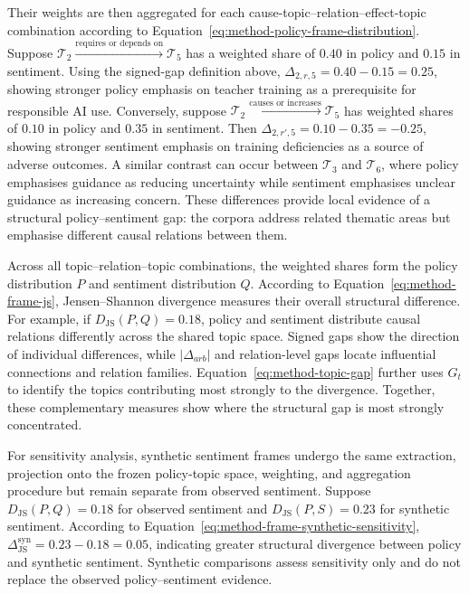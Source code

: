 {Their weights are then aggregated for each cause-topic--relation--effect-topic
combination according to Equation~\ref{eq:method-policy-frame-distribution}. Suppose
$\mathcal{T}_2\xrightarrow{\text{requires or depends on}}\mathcal{T}_5$ has a
weighted share of $0.40$ in policy and $0.15$ in sentiment. Using the signed-gap
definition above, $\Delta_{2,r,5}=0.40-0.15=0.25$, showing stronger policy emphasis
on teacher training as a prerequisite for responsible AI use. Conversely, suppose
$\mathcal{T}_2\xrightarrow{\text{causes or increases}}\mathcal{T}_5$ has weighted
shares of $0.10$ in policy and $0.35$ in sentiment. Then
$\Delta_{2,r',5}=0.10-0.35=-0.25$, showing stronger sentiment emphasis on training
deficiencies as a source of adverse outcomes. A similar contrast can occur between
$\mathcal{T}_3$ and $\mathcal{T}_6$, where policy emphasises guidance as reducing
uncertainty while sentiment emphasises unclear guidance as increasing concern. These
differences provide local evidence of a structural policy--sentiment gap: the corpora
address related thematic areas but emphasise different causal relations between them.

Across all topic--relation--topic combinations, the weighted shares form the policy
distribution $P$ and sentiment distribution $Q$. According to
Equation~\ref{eq:method-frame-js}, Jensen--Shannon divergence measures their overall
structural difference. For example, if $D_{\mathrm{JS}}(P,Q)=0.18$, policy and
sentiment distribute causal relations differently across the shared topic space.
Signed gaps show the direction of individual differences, while $|\Delta_{arb}|$ and
relation-level gaps locate influential connections and relation families.
Equation~\ref{eq:method-topic-gap} further uses $G_t$ to identify the topics
contributing most strongly to the divergence. Together, these complementary measures
show where the structural gap is most strongly concentrated.

For sensitivity analysis, synthetic sentiment frames undergo the same extraction,
projection onto the frozen policy-topic space, weighting, and aggregation procedure
but remain separate from observed sentiment. Suppose $D_{\mathrm{JS}}(P,Q)=0.18$ for
observed sentiment and $D_{\mathrm{JS}}(P,S)=0.23$ for synthetic sentiment. According
to Equation~\ref{eq:method-frame-synthetic-sensitivity},
$\Delta_{\mathrm{JS}}^{\mathrm{syn}}=0.23-0.18=0.05$, indicating greater structural
divergence between policy and synthetic sentiment. Synthetic comparisons assess
sensitivity only and do not replace the observed policy--sentiment evidence.
}


